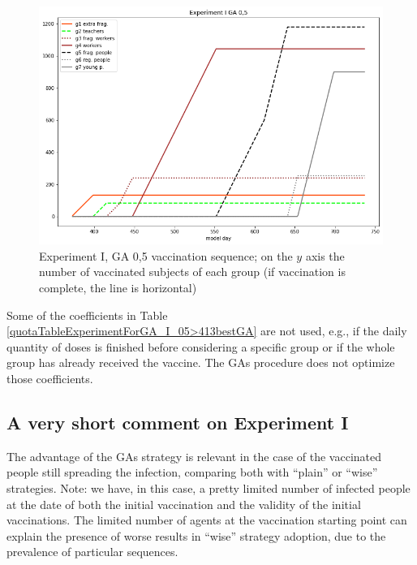 \documentclass[graybox]{svmult}
\begin{document}
\begin{figure}[t]
\center
\includegraphics[scale=0.45]{Experiment_I_GA_05_VaccinationSequence.png} %

\caption{Experiment I, GA 0,5 vaccination sequence; on the $y$ axis the number of vaccinated subjects of each group (if vaccination is complete, the line is horizontal)} 
\label{Experiment_I_GA05VaccinationSequence}
\end{figure}

Some of the coefficients in Table \ref{quotaTableExperimentForGA_I_05>413bestGA} are not used, e.g., if the daily quantity of doses is finished before considering a specific group or if the whole group has already received the vaccine. The GAs procedure does not optimize those coefficients.



\subsection{A very short comment on Experiment I}

The advantage of the GAs strategy is relevant in the case of the vaccinated people still spreading the infection, comparing both with ``plain'' or ``wise'' strategies. Note: we have, in this case, a pretty limited number of infected people at the date of both the initial vaccination and the validity of the initial vaccinations. The limited number of agents at the vaccination starting point can explain the presence of worse results in ``wise'' strategy adoption, due to the prevalence of particular sequences.
\end{document}
